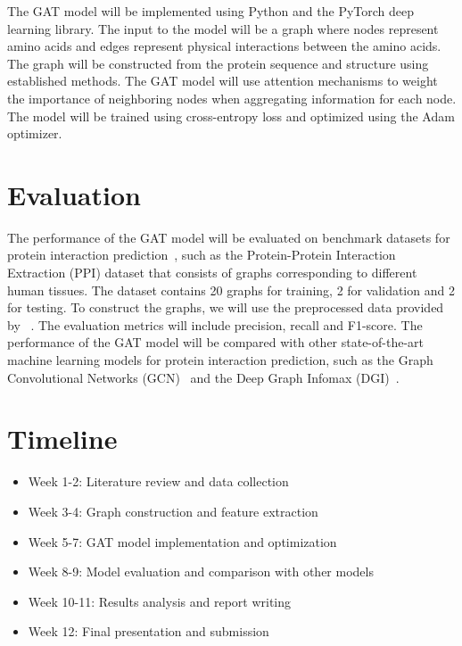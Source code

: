 \documentclass{article}
\begin{document}
    The GAT model will be implemented using Python and the PyTorch deep learning library.
    The input to the model will be a graph where nodes represent amino acids and edges represent physical interactions between the amino acids.
    The graph will be constructed from the protein sequence and structure using established methods.
    The GAT model will use attention mechanisms to weight the importance of neighboring nodes when aggregating information for each node.
    The model will be trained using cross-entropy loss and optimized using the Adam optimizer.


    \section{Evaluation}\label{sec:evaluation}

    The performance of the GAT model will be evaluated on benchmark datasets for protein interaction prediction~\cite{zitnik2017predicting},
    such as the Protein-Protein Interaction Extraction (PPI) dataset that consists of graphs corresponding to different human tissues.
    The dataset contains 20 graphs for training, 2 for validation and 2 for testing.
    To construct the graphs, we will use the preprocessed data provided by ~\cite{hamilton2017inductive}.
    The evaluation metrics will include precision, recall and F1-score.
    The performance of the GAT model will be compared with other state-of-the-art machine learning models for protein interaction prediction,
    such as the Graph Convolutional Networks (GCN)~\cite{kipf2016semi} and the Deep Graph Infomax (DGI)~\cite{velickovic2018deep}.


    \section{Timeline}\label{sec:timeline}

    \begin{itemize}
        \item Week 1-2: Literature review and data collection
        \item Week 3-4: Graph construction and feature extraction
        \item Week 5-7: GAT model implementation and optimization
        \item Week 8-9: Model evaluation and comparison with other models
        \item Week 10-11: Results analysis and report writing
        \item Week 12: Final presentation and submission
    \end{itemize}
\end{document}
